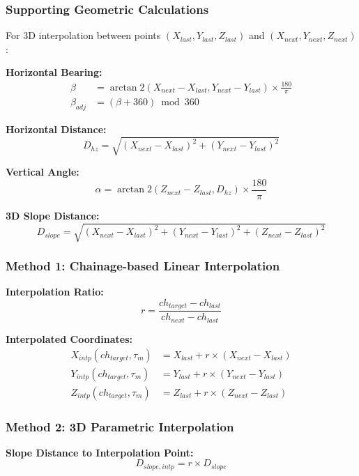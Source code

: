 \documentclass{article}
\begin{document}
\subsubsection{Supporting Geometric Calculations}
For 3D interpolation between points $(X_{last}, Y_{last}, Z_{last})$ and $(X_{next}, Y_{next}, Z_{next})$:

\textbf{Horizontal Bearing:}
\begin{align}
\beta &= \arctan2(X_{next} - X_{last}, Y_{next} - Y_{last}) \times \frac{180}{\pi} \\
\beta_{adj} &= (\beta + 360) \bmod 360
\end{align}

\textbf{Horizontal Distance:}
\begin{equation}
D_{hz} = \sqrt{(X_{next} - X_{last})^2 + (Y_{next} - Y_{last})^2}
\end{equation}

\textbf{Vertical Angle:}
\begin{equation}
\alpha = \arctan2(Z_{next} - Z_{last}, D_{hz}) \times \frac{180}{\pi}
\end{equation}

\textbf{3D Slope Distance:}
\begin{equation}
D_{slope} = \sqrt{(X_{next} - X_{last})^2 + (Y_{next} - Y_{last})^2 + (Z_{next} - Z_{last})^2}
\end{equation}

\subsubsection{Method 1: Chainage-based Linear Interpolation}
\textbf{Interpolation Ratio:}
\begin{equation}
r = \frac{ch_{target} - ch_{last}}{ch_{next} - ch_{last}}
\end{equation}

\textbf{Interpolated Coordinates:}
\begin{align}
X_{intp}(ch_{target}, \tau_m) &= X_{last} + r \times (X_{next} - X_{last}) \\
Y_{intp}(ch_{target}, \tau_m) &= Y_{last} + r \times (Y_{next} - Y_{last}) \\
Z_{intp}(ch_{target}, \tau_m) &= Z_{last} + r \times (Z_{next} - Z_{last})
\end{align}

\subsubsection{Method 2: 3D Parametric Interpolation}
\textbf{Slope Distance to Interpolation Point:}
\begin{equation}
D_{slope,intp} = r \times D_{slope}
\end{equation}
\end{document}
